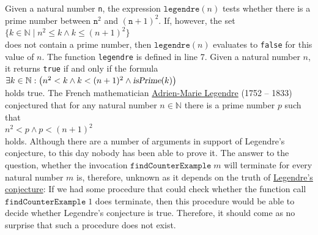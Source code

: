 Given a natural number \texttt{n}, the expression
$\texttt{legendre}(n)$ tests whether there is a prime number between $\texttt{n}^2$ and $(\texttt{n}+1)^2$.  
If, however, the set
\\[0.2cm]
\hspace*{1.3cm}
$\{ k \in \mathbb{N} \mid n^2 \leq k \wedge k \leq (n+1)^2 \}$
\\[0.2cm]
does not contain a prime number, then $\texttt{legendre}(n)$ evaluates
to \texttt{false} for this value of $n$.  The function \texttt{legendre} is defined in line 7.  
Given a natural number $n$, it returns \texttt{true} if and only if the formula
\\[0.2cm]
\hspace*{1.3cm}
$\exists k \in \mathbb{N}:\bigl( n^2 < k \wedge k < (n+1)^2 \wedge \textsl{isPrime}(k)\bigr)$
\\[0.2cm]
holds true.  The French mathematician 
\href{http://en.wikipedia.org/wiki/Adrien-Marie_Legendre}{Adrien-Marie Legendre} (1752 -- 1833) conjectured that
for any natural number $n \in \mathbb{N}$ there is a prime number $p$ such that
\\[0.2cm]
\hspace*{1.3cm}
$n^2 < p \wedge  p < (n+1)^2$
\\[0.2cm]
holds.  Although there are a number of arguments in support of Legendre's conjecture,  to this day
nobody has been able to prove it.  The answer to the question, whether the invocation $\texttt{findCounterExample}\;m$ will
terminate for every natural number $m$ is, therefore, unknown as it depends on the truth of 
\href{http://en.wikipedia.org/wiki/Legendre's_conjecture}{Legendre's conjecture}:  If we
had some procedure that could check whether the function call $\texttt{findCounterExample}\;1$ does terminate,
then this procedure would be able to decide whether Legendre's conjecture is true.  Therefore, it
should come as no surprise that such a procedure does not exist.


